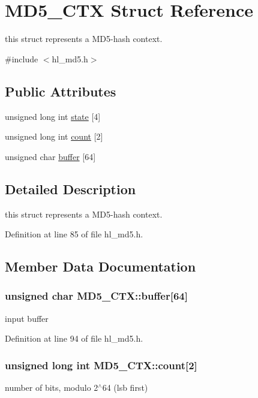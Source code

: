 \hypertarget{struct_m_d5___c_t_x}{
\section{MD5\_\-CTX Struct Reference}
\label{struct_m_d5___c_t_x}
}


this struct represents a MD5-\/hash context.  


{\ttfamily \#include $<$hl\_\-md5.h$>$}\subsection*{Public Attributes}
\begin{DoxyCompactItemize}
\item 
unsigned long int \hyperlink{struct_m_d5___c_t_x_a2f697997f51de65d08227fdf1d5c44b8}{state} \mbox{[}4\mbox{]}
\item 
unsigned long int \hyperlink{struct_m_d5___c_t_x_a889cb6e121b82a1e7f4d92120fb8a523}{count} \mbox{[}2\mbox{]}
\item 
unsigned char \hyperlink{struct_m_d5___c_t_x_a2da73ecf544745f58211e998719f367f}{buffer} \mbox{[}64\mbox{]}
\end{DoxyCompactItemize}


\subsection{Detailed Description}
this struct represents a MD5-\/hash context. 

Definition at line 85 of file hl\_\-md5.h.

\subsection{Member Data Documentation}
\hypertarget{struct_m_d5___c_t_x_a2da73ecf544745f58211e998719f367f}{
\subsubsection[{buffer}]{\setlength{\rightskip}{0pt plus 5cm}unsigned char {\bf MD5\_\-CTX::buffer}\mbox{[}64\mbox{]}}}
\label{struct_m_d5___c_t_x_a2da73ecf544745f58211e998719f367f}
input buffer 

Definition at line 94 of file hl\_\-md5.h.\hypertarget{struct_m_d5___c_t_x_a889cb6e121b82a1e7f4d92120fb8a523}{
\subsubsection[{count}]{\setlength{\rightskip}{0pt plus 5cm}unsigned long int {\bf MD5\_\-CTX::count}\mbox{[}2\mbox{]}}}
\label{struct_m_d5___c_t_x_a889cb6e121b82a1e7f4d92120fb8a523}
number of bits, modulo 2$^\wedge$64 (lsb first) 

